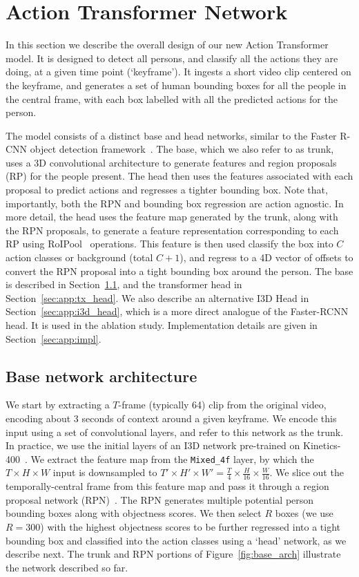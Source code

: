 \documentclass[10pt,twocolumn,letterpaper]{article}
\newcommand{\Tx}[0]{Action Transformer}
\begin{document}
\section{\Tx{}  Network}\label{sec:app}


In this section we describe the overall design of our new \Tx{} model.
It is designed  to detect all persons, and
classify all the actions they are doing, at a given time point
(`keyframe').  It ingests a short video clip 
centered on the keyframe, and generates
a set of human bounding boxes for all the people in the central frame,
with each box labelled with all the
predicted actions for the person.

The model  consists of a distinct base and head networks, similar to the
Faster R-CNN object
detection framework~\cite{ren2015faster}.  The base, which we also refer to as trunk, uses a 
3D convolutional
architecture to generate features and region
proposals (RP) for the people present. The head then uses the features associated with each proposal to
predict actions and regresses a tighter bounding box. Note that, importantly, both the RPN and bounding box
regression 
are action agnostic. 
In more detail, the head 
uses the feature map generated by the
trunk, along with the RPN proposals, to generate a feature
representation corresponding to each RP using RoIPool~\cite{huang2017speed} operations.
This feature is then used classify the box into $C$ action classes or background (total $C+1$),
and regress to a 4D vector of offsets to convert the RPN proposal into
a tight bounding box around the person.  The base  is described in
Section~\ref{sec:app:base_arch}, and the transformer head in
Section~\ref{sec:app:tx_head}. We also describe an alternative
I3D Head in
Section~\ref{sec:app:i3d_head}, which is a more direct analogue of the
Faster-RCNN head. It is used in the ablation study.  Implementation
details are given in Section~\ref{sec:app:impl}.

\subsection{Base network architecture}\label{sec:app:base_arch}

We start by
extracting a $T$-frame (typically 64) clip from the original video,
encoding about 3 seconds of context around a given keyframe. We encode
this input using a set of convolutional layers, and refer to this
network as the trunk. In practice, we use the initial layers of an I3D
network pre-trained on Kinetics-400~\cite{carreira2017quo}. We extract
the feature map from the {\tt Mixed\_4f} layer, by which the $T\times
H\times W$ input is downsampled to $T'\times H'\times W' = \frac{T}{4}
\times \frac{H}{16} \times \frac{W}{16}$. We slice out the temporally-central 
frame from this feature map and pass it through a region
proposal network (RPN)~\cite{ren2015faster}.  The RPN generates
multiple potential person bounding boxes along with objectness
scores. We then select $R$ boxes (we use $R=300$) with the highest objectness scores to be
further regressed into a tight bounding box and classified into the
action classes using a `head' network, as we describe next.  The trunk
and RPN portions of Figure~\ref{fig:base_arch} illustrate the network
described so far.
\end{document}
